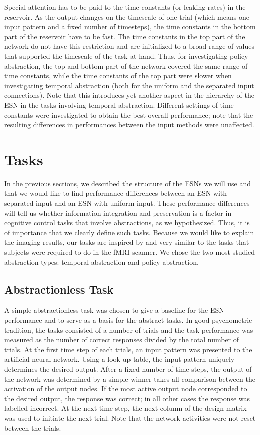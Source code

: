 \documentclass[10pt,a4paper]{report}
\begin{document}
Special attention has to be paid to the time constants (or leaking rates) in the reservoir. As the output changes on the timescale of one trial (which means one input pattern and a fixed number of timesteps), the time constants in the bottom part of the reservoir have to be fast. The time constants in the top part of the network do not have this restriction and are initialized to a broad range of values that supported the timescale of the task at hand. Thus, for investigating policy abstraction, the top and bottom part of the network covered the same range of time constants, while the time constants of the top part were slower when investigating temporal abstraction (both for the uniform and the separated input connections). Note that this introduces yet another aspect in the hierarchy of the ESN in the tasks involving temporal abstraction. Different settings of time constants were investigated to obtain the best overall performance; note that the resulting differences in performances between the input methods were unaffected.

\section{Tasks}

In the previous sections, we described the structure of the ESNs we will use and that we would like to find performance differences between an ESN with separated input and an ESN with uniform input. These performance differences will tell us whether information integration and preservation is a factor in cognitive control tasks that involve abstractions, as we hypothesized. Thus, it is of importance that we clearly define such tasks. Because we would like to explain the imaging results, our tasks are inspired by and very similar to the tasks that subjects were required to do in the fMRI scanner. We chose the two most studied abstraction types: temporal abstraction and policy abstraction.

\subsection*{Abstractionless Task}
A simple abstractionless task was chosen to give a baseline for the ESN performance and to serve as a basis for the abstract tasks. In good psychometric tradition, the tasks consisted of a number of trials and the task performance was measured as the number of correct responses divided by the total number of trials. At the first time step of each trials, an input pattern was presented to the artificial neural network. Using a look-up table, the input pattern uniquely determines the desired output. After a fixed number of time steps, the output of the network was determined by a simple winner-takes-all comparison between the activation of the output nodes. If the most active output node corresponded to the desired output, the response was correct; in all other cases the response was labelled incorrect. At the next time step, the next column of the design matrix was used to initiate the next trial. Note that the network activities were not reset between the trials. 
\end{document}
